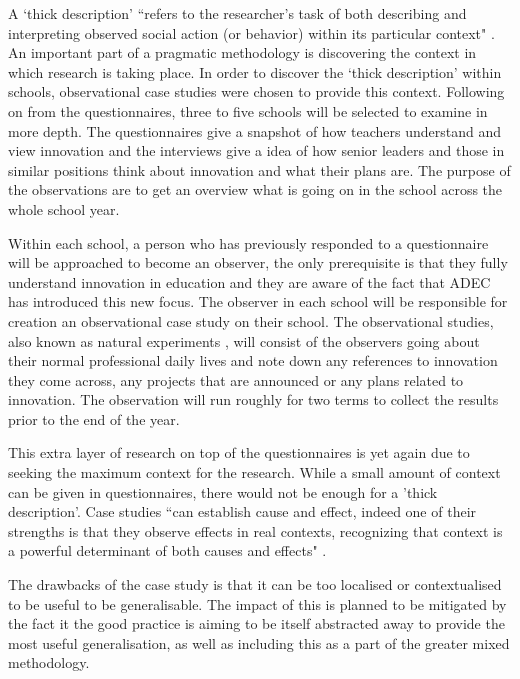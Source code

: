 \documentclass[11pt]{article}
\begin{document}
A `thick description' ``refers to the researcher's task of both describing and interpreting observed social action (or behavior) within its particular context" \cite[p. 543]{thickdescription}. An important part of a pragmatic methodology is discovering the context in which research is taking place. In order to discover the `thick description' within schools, observational case studies were chosen to provide this context.
Following on from the questionnaires, three to five schools will be selected to examine in more depth. The questionnaires give a snapshot of how teachers understand and view innovation and the interviews give a idea of how senior leaders and those in similar positions think about innovation and what their plans are. The purpose of the observations are to get an overview what is going on in the school across the whole school year. 

Within each school, a person who has previously responded to a questionnaire will be approached to become an observer, the only prerequisite is that they fully understand innovation in education and they are aware of the fact that ADEC has introduced this new focus. The observer in each school will be responsible for creation an observational case study on their school. The observational studies, also known as natural experiments \cite[p. 2]{0a338f}, will consist of the observers going about their normal professional daily lives and note down any references to innovation they come across, any projects that are announced or any plans related to innovation. The observation will run roughly for two terms to collect the results prior to the end of the year.

This extra layer of research on top of the questionnaires is yet again due to seeking the maximum context for the research. While a small amount of context can be given in questionnaires, there would not be enough for a 'thick description'. Case studies ``can establish cause and effect, indeed one of their strengths is that they observe effects in real contexts, recognizing that context is a powerful determinant of both causes and effects" \cite[p. 181]{Cohen2005}.

The drawbacks of the case study is that it can be too localised or contextualised to be useful to be generalisable. The impact of this is planned to be mitigated by the fact it the good practice is aiming to be itself abstracted away to provide the most useful generalisation, as well as including this as a part of the greater mixed methodology.
\end{document}
